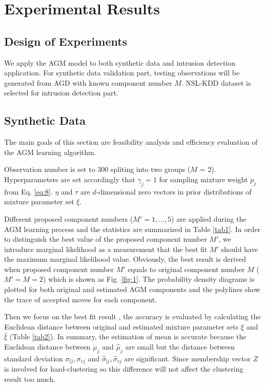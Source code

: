 \documentclass[conference]{llncs}
\begin{document}
\section{Experimental Results}
\subsection{Design of Experiments}
We apply the AGM model to both synthetic data and intrusion detection application. For synthetic data validation part, testing observations will be generated from AGD with known component number $M$. NSL-KDD dataset \cite{b14} is selected for intrusion detection part.

\subsection{Synthetic Data}
The main goals of this section are feasibility analysis and efficiency evaluation of the AGM learning algorithm.

Observation number is set to 300 spliting into two groups ($M$ = 2). Hyperparameters are set accordingly that $\gamma_j = 1$ \cite{b15} for sampling mixture weight $p_j$ from Eq. \eqref{eq:8}. $\eta$ and $\tau$ are $d$-dimensional zero vectors in prior distributions of mixture parameter set $\xi$.

Different proposed component numbers ($M' = 1,\dots,5$) are applied during the AGM learning process and the statistics are summarized in Table \ref{tab1}. In order to distinguish the best value of the proposed component number $M'$, we introduce marginal likelihood \cite{b6} as a measurement that the best fit $M'$ should have the maximum marginal likelihood value. Obviously, the best result is derived when proposed component number $M'$ equals to original component number $M$ ($M' = M = 2$) which is shown as Fig. \ref{fig:1}. The probability density diagrams is plotted for both original and estimated AGM components and the polylines show the trace of accepted moves for each component.

Then we focus on the best fit result , the accuracy is evaluated by calculating the Euclidean distance between original and estimated mixture parameter sets $\xi$ and $\hat{\xi}$ (Table \ref{tab2}). In summary, the estimation of mean is accurate because the Euclidean distance between $\mu_j$ and $\hat{\mu}_j$ are small but the distance between standard deviation $\sigma_{lj}, \sigma_{rj}$ and $\hat{\sigma}_{lj}, \hat{\sigma}_{rj}$ are significant. Since membership vector $Z$ is involved for hard-clustering so this difference will not affect the clustering result too much.
\end{document}
